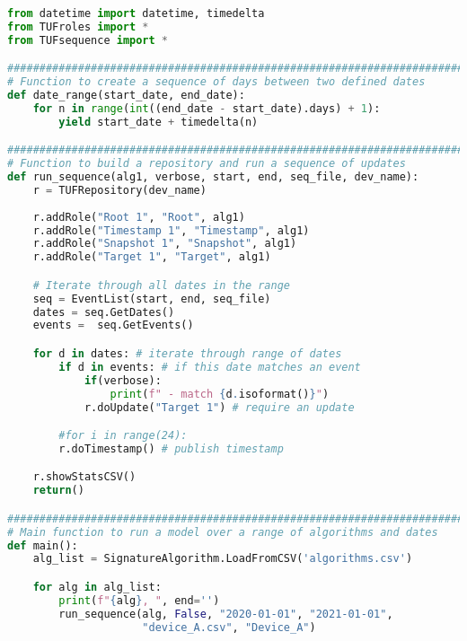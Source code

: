 \documentclass{article}
\begin{document}
\begin{lstlisting}[language=Python, basicstyle=\tiny]
from datetime import datetime, timedelta
from TUFroles import *
from TUFsequence import *

###############################################################################
# Function to create a sequence of days between two defined dates
def date_range(start_date, end_date):
    for n in range(int((end_date - start_date).days) + 1):
        yield start_date + timedelta(n)

################################################################################
# Function to build a repository and run a sequence of updates
def run_sequence(alg1, verbose, start, end, seq_file, dev_name):
    r = TUFRepository(dev_name)
    
    r.addRole("Root 1", "Root", alg1)
    r.addRole("Timestamp 1", "Timestamp", alg1)
    r.addRole("Snapshot 1", "Snapshot", alg1)
    r.addRole("Target 1", "Target", alg1)

    # Iterate through all dates in the range
    seq = EventList(start, end, seq_file)
    dates = seq.GetDates()
    events =  seq.GetEvents()

    for d in dates: # iterate through range of dates
        if d in events: # if this date matches an event
            if(verbose):
                print(f" - match {d.isoformat()}")
            r.doUpdate("Target 1") # require an update

        #for i in range(24):
        r.doTimestamp() # publish timestamp

    r.showStatsCSV()
    return()

###############################################################################
# Main function to run a model over a range of algorithms and dates
def main():
    alg_list = SignatureAlgorithm.LoadFromCSV('algorithms.csv')

    for alg in alg_list:
        print(f"{alg}, ", end='')
        run_sequence(alg, False, "2020-01-01", "2021-01-01",
                     "device_A.csv", "Device_A")
\end{lstlisting}


\end{document}
